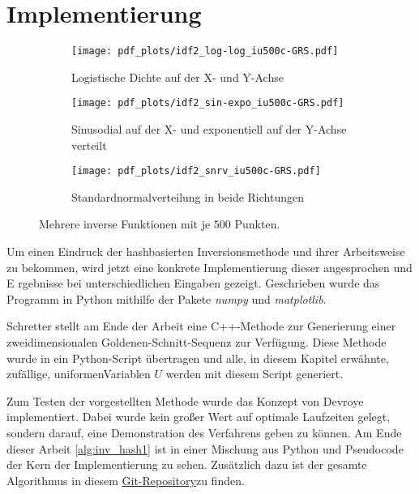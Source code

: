 \section{Implementierung}
\label{impl}
\begin{figure*}%
    \centering
    \begin{subfigure}[b]{.3\textwidth}
        \centering
        \texttt{[image: pdf\_plots/idf2\_log-log\_iu500c-GRS.pdf]}
        \caption{Logistische Dichte auf der X- und Y-Achse}
        \label{fig:loglog_examplePlot}
    \end{subfigure}
    \hfill
    \begin{subfigure}[b]{.3\textwidth}
        \centering
        \texttt{[image: pdf\_plots/idf2\_sin-expo\_iu500c-GRS.pdf]}
        \caption{Sinusodial auf der X- und exponentiell auf der Y-Achse verteilt}
        \label{fig:sinexpo_examplePlot}
    \end{subfigure}
    \hfill
    \begin{subfigure}[b]{.3\textwidth}
        \centering
        \texttt{[image: pdf\_plots/idf2\_snrv\_iu500c-GRS.pdf]}
        \caption{Standardnormalverteilung in beide Richtungen}
        \label{fig:snrv_examplePlot}
    \end{subfigure}
    \caption{Mehrere inverse Funktionen mit je $500$ Punkten.}
    \label{fig:examplePlot}
\end{figure*}

Um einen Eindruck der hashbasierten Inversionsmethode und ihrer Arbeitsweise zu 
bekommen, wird jetzt eine konkrete Implementierung dieser angesprochen und E
rgebnisse bei unterschiedlichen Eingaben gezeigt. Geschrieben wurde das Programm 
in Python mithilfe der Pakete \textit{numpy} und \textit{matplotlib}.

Schretter \cite{schretter-golden_ratio_sequences-2012} stellt am Ende der Arbeit 
eine C++-Methode zur Generierung einer zweidimensionalen Goldenen-Schnitt-Sequenz 
zur Verfügung. Diese Methode wurde in ein Python-Script übertragen und alle, in 
diesem Kapitel erwähnte, zufällige, uniformenVariablen $U$ werden mit diesem Script 
generiert.

Zum Testen der vorgestellten Methode wurde das Konzept von Devroye \cite{devroye-non_uniform_random_variate-1986} 
implementiert. Dabei wurde kein großer Wert auf optimale Laufzeiten gelegt, sondern 
darauf, eine Demonstration des Verfahrens geben zu können. Am Ende dieser Arbeit \ref{alg:inv_hash1}
ist in einer Mischung aus Python und Pseudocode der Kern der Implementierung zu 
sehen. Zusätzlich dazu ist der gesamte Algorithmus in diesem \href{https:github.com/knirschl/Proseminar-Anthropomatik}
{Git-Repository}zu finden. 

